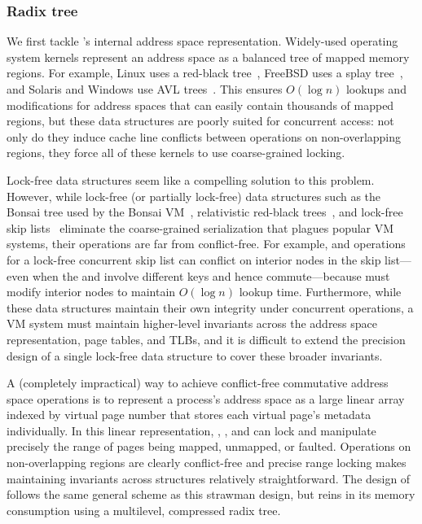 \subsubsection{Radix tree}
\label{sec:radixvm:tree}


We first tackle \vm's internal address space representation.
%
Widely-used operating system kernels represent an address space as a
balanced tree of mapped memory regions.  For example, Linux uses a
red-black tree~\cite{linux-source}, FreeBSD uses a splay
tree~\cite{freebsd-source}, and Solaris and Windows use AVL
trees~\cite{windows:wrk,windows:slides}.  This ensures $O(\log n)$ lookups
and modifications for address spaces that can easily contain thousands
of mapped regions, but these data structures are poorly suited for
concurrent access: not only do they induce cache line conflicts
between operations on non-overlapping regions, they force all of these
kernels to use coarse-grained locking.

Lock-free data structures seem like a compelling solution to this
problem.  However, while lock-free (or partially lock-free) data
structures such as the Bonsai tree used by the Bonsai
VM~\cite{clements:bonsai}, relativistic red-black
trees~\cite{howard:relrbtree}, and lock-free skip
lists~\cite{herlihy:art} eliminate the coarse-grained serialization
that plagues popular VM systems, their operations are far from
conflict-free.  For example,  and 
operations for a lock-free concurrent skip list can conflict on
interior nodes in the skip list---even when the  and
 involve different keys and hence commute---because
 must modify interior nodes to maintain $O(\log n)$
lookup time.
Furthermore, while these data structures maintain their own integrity
under concurrent operations, a VM system must maintain higher-level
invariants across the address space representation, page tables, and
TLBs, and it is difficult to extend the precision design of a single
lock-free data structure to cover these broader invariants.

A (completely impractical) way to achieve conflict-free commutative
address space
operations is to represent a process's address space as a large linear
array indexed by virtual page number that stores each virtual page's
metadata individually.
%
In this linear representation, , ,
and  can lock and manipulate precisely the range of
pages being mapped, unmapped, or faulted.
%
Operations on non-overlapping regions are clearly conflict-free and
precise range locking makes maintaining invariants across structures
relatively straightforward.
%
The design of \vm follows the same general
scheme as this strawman design, but reins in its memory consumption
using a multilevel, compressed radix tree.

